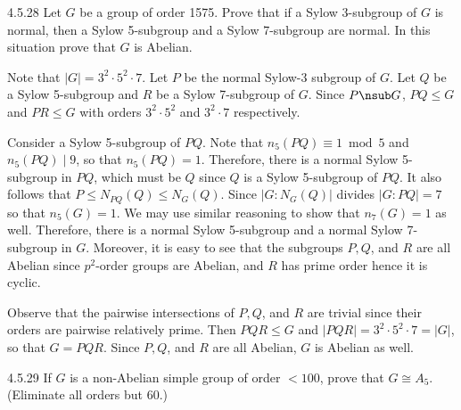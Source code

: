 \begin{exercise}{4.5.28}
	Let $G$ be a group of order 1575.
	Prove that if a Sylow 3-subgroup of $G$ is normal, then a Sylow 5-subgroup and a Sylow 7-subgroup are normal.
	In this situation prove that $G$ is Abelian.
\end{exercise}

\begin{sol}
	Note that $|G| = 3^2 \cdot 5^2 \cdot 7$.
	Let $P$ be the normal Sylow-3 subgroup of $G$.
	Let $Q$ be a Sylow 5-subgroup and $R$ be a Sylow 7-subgroup of $G$.
	Since $P \nsub G$, $PQ \leq G$ and $PR \leq G$ with orders $3^2 \cdot 5^2$ and $3^2 \cdot 7$ respectively. 

	Consider a Sylow 5-subgroup of $PQ$.
	Note that $n_5(PQ) \equiv 1 \bmod 5$ and $n_5(PQ) \mid 9$, so that $n_5(PQ) = 1$.
	Therefore, there is a normal Sylow 5-subgroup in $PQ$, which must be $Q$ since $Q$ is a Sylow 5-subgroup of $PQ$.
	It also follows that $P \leq N_{PQ}(Q) \leq N_G(Q)$.
	Since $|G : N_G(Q)|$ divides $|G : PQ| = 7$ so that $n_5(G) = 1$.
	We may use similar reasoning to show that $n_7(G) = 1$ as well.
	Therefore, there is a normal Sylow 5-subgroup and a normal Sylow 7-subgroup in $G$.
	Moreover, it is easy to see that the subgroups $P, Q$, and $R$ are all Abelian since $p^2$-order groups are Abelian, and $R$ has prime order hence it is cyclic.

	Observe that the pairwise intersections of $P, Q$, and $R$ are trivial since their orders are pairwise relatively prime.
	Then $PQR \leq G$ and $|PQR| = 3^2 \cdot 5^2 \cdot 7 = |G|$, so that $G = PQR$.
	Since $P, Q$, and $R$ are all Abelian, $G$ is Abelian as well.
\end{sol}

\begin{spex}{4.5.29}
	If $G$ is a non-Abelian simple group of order $< 100$, prove that $G \cong A_5$. (Eliminate all orders but 60.)
\end{spex}

